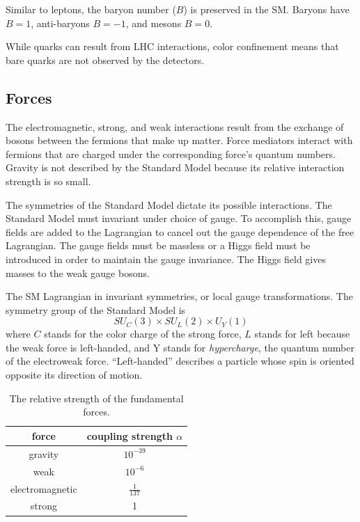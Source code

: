 Similar to leptons, the baryon number ($B$) is preserved in the \ac{SM}. Baryons have $B = 1$, anti-baryons $B=-1$, and mesons $B=0$.

While quarks can result from \ac{LHC} interactions, color confinement means that bare quarks are not observed by the detectors.

\subsection{Forces}

The electromagnetic, strong, and weak interactions result from the exchange of bosons between the fermions that make up matter. Force mediators interact with fermions that are charged under the corresponding force's quantum numbers. Gravity is not described by the Standard Model because its relative interaction strength is so small.

The symmetries of the Standard Model dictate its possible interactions. The Standard Model must invariant under choice of gauge. To accomplish this, gauge fields are added to the Lagrangian to cancel out the gauge dependence of the free Lagrangian. The gauge fields must be massless or a Higgs field must be introduced in order to maintain the gauge invariance. The Higgs field gives masses to the weak gauge bosons.

The \ac{SM} Lagrangian in invariant symmetries, or local gauge transformations. The symmetry group of the Standard Model is 
\begin{equation}
SU_{C}(3) \times SU_{L}(2) \times U_{Y}(1) 
\end{equation}
where $C$ stands for the color charge of the strong force, $L$ stands for left because the weak force is left-handed, and Y stands for \emph{hypercharge}, the quantum number of the electroweak force. ``Left-handed'' describes a particle whose spin is oriented opposite its direction of motion. 


\begin{table}[htb]
\begin{center}
\begin{tabular}{cc}
 force & coupling strength $\alpha$ \\
 \hline
  gravity   &  $10^{-39}$    \\
  weak      &  $10^{-6}$     \\
  electromagnetic  &  $\frac{1}{137} $   \\
  strong  &  1     \\
\hline
\end{tabular}
\caption{The relative strength of the fundamental forces.}
\end{center}
\end{table}


